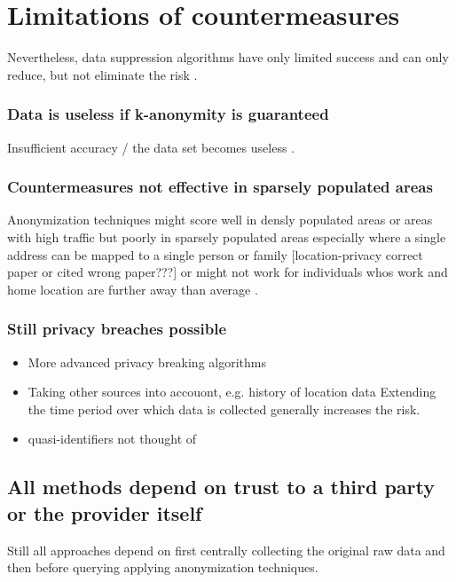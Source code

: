 \section{Limitations of countermeasures}
Nevertheless, data suppression algorithms have only limited success and can only reduce, but not eliminate the risk \parencite{hoh2006enhancing}. 

\subsubsection{Data is useless if k-anonymity is guaranteed}
Insufficient accuracy / the data set becomes useless \parencite{krumm, cellphone, k-anonymity-old, k-anonymity, k-anonymity-achieving}.

\subsubsection{Countermeasures not effective in sparsely populated areas}
Anonymization techniques might score well in densly populated areas or areas with high traffic but poorly in sparsely populated areas especially where a single address can be mapped to a single person or family \parencite{time-to-confusion, location-privacy, hoh2006enhancing} [location-privacy correct paper or cited wrong paper???] or might not work for individuals whos work and home location are further away than average \parencite{privacy-home-work-pairs}.

\subsubsection{Still privacy breaches possible}
\begin{itemize}
	\item More advanced privacy breaking algorithms
\item Taking other sources into accouont, e.g. history of location data
Extending the time period over which data is collected generally increases the risk.

\item quasi-identifiers not thought of
\end{itemize}

\subsection{All methods depend on trust to a third party or the provider itself}
Still all approaches depend on first centrally collecting the original raw data and then before querying \parencite{k-anonymity} applying anonymization techniques.


